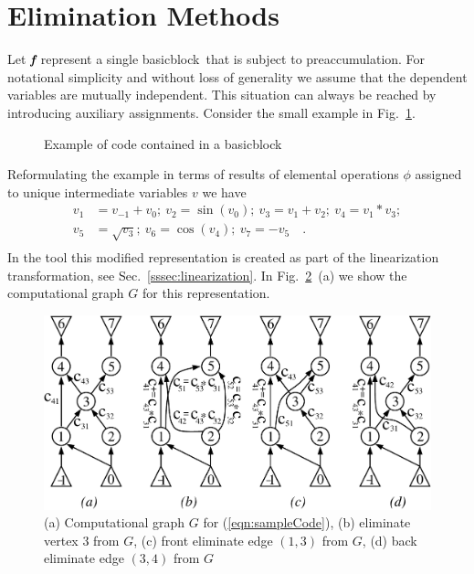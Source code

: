 \documentclass{book}
\newcommand{\basicblock}{basicblock}
\newcommand{\bmf}{\mbox{\bf\em f}}
\newcommand{\refsec}[1]{{Sec.~\ref{#1}}}
\newcommand{\reffig}[1]{{Fig.~\ref{#1}}}
\newcommand{\refeqn}[1]{{(\ref{#1})}}
\begin{document}
\section{Elimination Methods} \label{sec:elimMeth}
Let $\bmf$ represent a single \basicblock\ that is subject to preaccumulation.
For notational simplicity and without loss of generality we assume that the 
dependent variables are mutually independent. 
This situation can always be
reached by introducing auxiliary assignments.
Consider the small example in \reffig{fig:toyBB}.
\begin{figure}[h]
  \begin{center}
    \begin{minipage}{.4\textwidth}
      \fontsize{8pt}{9pt}
    \end{minipage}
  \end{center}
  \caption{Example of code contained in a \basicblock}\label{fig:toyBB}
\end{figure}
Reformulating the example in terms of 
results of elemental operations $\phi$ assigned to unique intermediate 
variables $v$ we have 
\begin{equation}\label{eqn:sampleCode}
  \begin{split}
    v_1&=v_{-1}+v_0;~v_2=\sin(v_0);~v_3=v_1+v_2;~v_4=v_1*v_3; \\
    v_5&=\sqrt{v_3};~v_6=\cos(v_4);~v_7=-v_5 \quad .\\
  \end{split}
\end{equation}
In the tool this modified representation is created as part of the linearization transformation, see 
\refsec{sssec:linearization}.
In \reffig{fig:elims}~(a) we show the computational graph $G$ for this representation.
\begin{figure}
  \centering\includegraphics[width=.7\textwidth]{elims}
  \caption{
    (a) Computational graph $G$ for \refeqn{eqn:sampleCode}, 
    (b) eliminate vertex 3 from $G$, 
    (c) front eliminate edge $(1,3)$ from $G$, 
    (d) back eliminate edge $(3,4)$ from $G$} 
  \label{fig:elims}
\end{figure}
\end{document}
